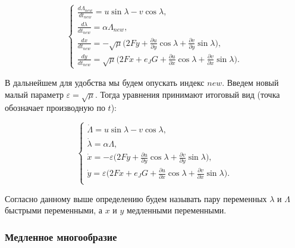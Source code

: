 \begin{equation*}
    \begin{cases}
        \frac{d \Lambda_{new}}{dt_{new}} = u \sin \lambda - v \cos \lambda, \\
        \frac{d \lambda}{dt_{new}} = \alpha \Lambda_{new}, \\
        \frac{dx}{dt_{new}} = -\sqrt \mu \big( 2Fy+\frac{\partial u}{\partial y} \cos \lambda + \frac{\partial v}{\partial y} \sin \lambda \big), \\
        \frac{dy}{dt_{new}} = \sqrt \mu \big( 2Fx+e_JG +\frac{\partial u}{\partial x} \cos \lambda + \frac{\partial v}{\partial x} \sin \lambda \big).
    \end{cases}
\end{equation*}

В дальнейшем для удобства мы будем опускать индекс $new$. Введем новый малый параметр $\varepsilon = \sqrt \mu$. Тогда уравнения принимают итоговый вид (точка обозначает производную по $t$):

\begin{equation}
    \begin{cases}
        \dot \Lambda = u \sin \lambda - v \cos \lambda, \\
        \dot \lambda = \alpha \Lambda, \\
        \dot x = -\varepsilon \big( 2Fy+\frac{\partial u}{\partial y} \cos \lambda + \frac{\partial v}{\partial y} \sin \lambda \big), \\
        \dot y = \varepsilon \big( 2Fx+e_JG +\frac{\partial u}{\partial x} \cos \lambda + \frac{\partial v}{\partial x} \sin \lambda \big). \\
    \end{cases}
    \label{fullt}
\end{equation}

Согласно данному выше определению будем называть пару переменных $\lambda$ и $\Lambda$ быстрыми переменными, а $x$ и $y$ медленными переменными.

\subsubsection{Медленное многообразие}

